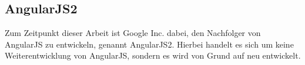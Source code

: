 \subsection{AngularJS2}
\label{sec:angularjs2}

Zum Zeitpunkt dieser Arbeit ist Google Inc. dabei, den Nachfolger von AngularJS zu entwickeln, genannt AngularJS2. Hierbei handelt es sich um keine Weiterentwicklung von AngularJS, sondern es wird von Grund auf neu entwickelt.







